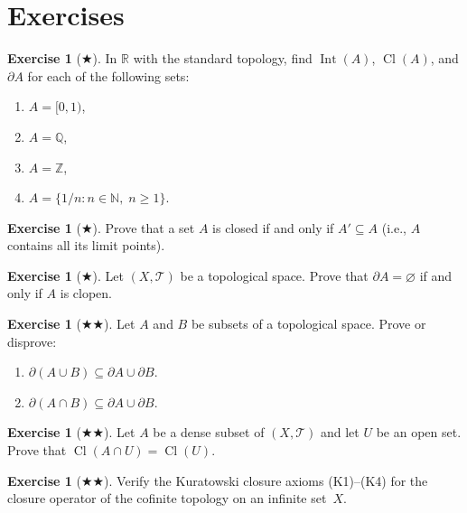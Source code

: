 \documentclass[11pt,a4paper,twoside]{book}
\theoremstyle{remark}
\theoremstyle{definition}
\newtheorem{exerciseplain}[theorem]{Exercise}
\theoremstyle{definition}
\newenvironment{exercise}[1][]{%
  \begin{exerciseplain}[#1]
}{%
  \end{exerciseplain}
}
\newcommand{\Tau}{\mathcal{T}}           %
\newcommand{\boundary}{\partial}         %
\newcommand{\R}{\mathbb{R}}
\newcommand{\N}{\mathbb{N}}
\newcommand{\Z}{\mathbb{Z}}
\newcommand{\Q}{\mathbb{Q}}
\DeclareMathOperator{\Int}{Int}
\DeclareMathOperator{\Cl}{Cl}
\begin{document}
\section{Exercises}
\label{sec:exercises-ch2}

\begin{exercise}[$\bigstar$]
\label{exer:ch2:1}
In $\R$ with the standard topology, find $\Int(A)$, $\Cl(A)$, and
$\boundary A$ for each of the following sets:
\begin{enumerate}[label=(\alph*)]
  \item $A=[0,1)$,
  \item $A=\Q$,
  \item $A=\Z$,
  \item $A=\{1/n:n\in\N,\;n\geq 1\}$.
\end{enumerate}
\end{exercise}

\begin{exercise}[$\bigstar$]
\label{exer:ch2:2}
Prove that a set $A$ is closed if and only if $A'\subseteq A$ (i.e., $A$
contains all its limit points).
\end{exercise}

\begin{exercise}[$\bigstar$]
\label{exer:ch2:3}
Let $(X,\Tau)$ be a topological space.  Prove that $\boundary A=\varnothing$
if and only if $A$ is clopen.
\end{exercise}

\begin{exercise}[$\bigstar\!\bigstar$]
\label{exer:ch2:4}
Let $A$ and $B$ be subsets of a topological space.  Prove or disprove:
\begin{enumerate}[label=(\alph*)]
  \item $\boundary(A\cup B)\subseteq\boundary A\cup\boundary B$.
  \item $\boundary(A\cap B)\subseteq\boundary A\cup\boundary B$.
\end{enumerate}
\end{exercise}

\begin{exercise}[$\bigstar\!\bigstar$]
\label{exer:ch2:5}
Let $A$ be a dense subset of $(X,\Tau)$ and let $U$ be an open set.  Prove
that $\Cl(A\cap U)=\Cl(U)$.
\end{exercise}

\begin{exercise}[$\bigstar\!\bigstar$]
\label{exer:ch2:6}
Verify the Kuratowski closure axioms \textup{(K1)--(K4)} for the closure
operator of the cofinite topology on an infinite set~$X$.
\end{exercise}
\end{document}
